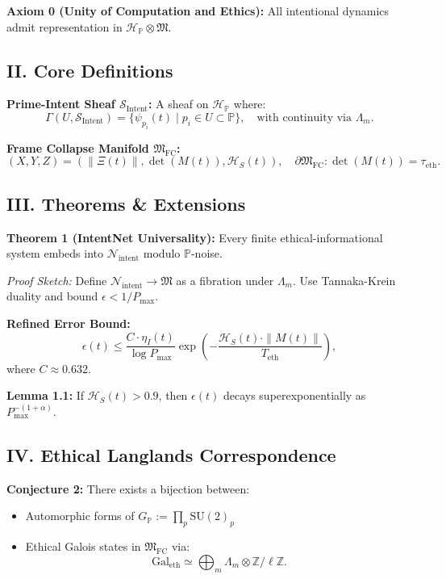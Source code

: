 \documentclass[12pt]{article}
\begin{document}
\textbf{Axiom 0 (Unity of Computation and Ethics):} All intentional dynamics admit representation in $\mathcal{H}_{\mathbb{P}} \otimes \mathfrak{M}$.

\subsection*{II. Core Definitions}
\textbf{Prime-Intent Sheaf $\mathcal{S}_{\text{Intent}}$:}
A sheaf on $\mathcal{H}_{\mathbb{P}}$ where:
\[
\Gamma(U, \mathcal{S}_{\text{Intent}}) = \{ \psi_{p_i}(t) \mid p_i \in U \subset \mathbb{P} \}, \quad \text{with continuity via } \Lambda_m.
\]

\textbf{Frame Collapse Manifold $\mathfrak{M}_{\text{FC}}$:}
\[
(X, Y, Z) = \left( \|\Xi(t)\|, \det(M(t)), \mathcal{H}_S(t) \right), \quad \partial \mathfrak{M}_{\text{FC}}: \det(M(t)) = \tau_{\text{eth}}.
\]

\subsection*{III. Theorems \& Extensions}

\textbf{Theorem 1 (IntentNet Universality):}
Every finite ethical-informational system embeds into $\mathcal{N}_{\text{intent}}$ modulo $\mathbb{P}$-noise.

\textit{Proof Sketch:} 
Define $\mathcal{N}_{\text{intent}} \to \mathfrak{M}$ as a fibration under $\Lambda_m$. Use Tannaka-Krein duality and bound $\epsilon < 1/P_{\text{max}}$.

\textbf{Refined Error Bound:}
\[
\epsilon(t) \leq \frac{C \cdot \eta_I(t)}{\log P_{\text{max}}} \exp\left(-\frac{\mathcal{H}_S(t) \cdot \|M(t)\|}{T_{\text{eth}}}\right),
\]
where $C \approx 0.632$.

\textbf{Lemma 1.1:}
If $\mathcal{H}_S(t) > 0.9$, then $\epsilon(t)$ decays superexponentially as $P_{\text{max}}^{-(1 + \alpha)}$.

\subsection*{IV. Ethical Langlands Correspondence}
\textbf{Conjecture 2:}
There exists a bijection between:
\begin{itemize}
  \item Automorphic forms of $G_{\mathbb{P}} := \prod_{p} \text{SU}(2)_p$
  \item Ethical Galois states in $\mathfrak{M}_{\text{FC}}$ via:
\[
\text{Gal}_{\text{eth}} \simeq \bigoplus_{m} \Lambda_m \otimes \mathbb{Z}/\ell\mathbb{Z}.
\]
\end{itemize}
\end{document}
